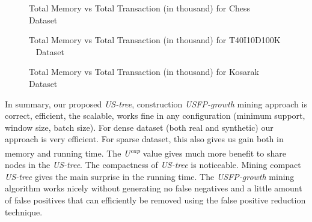 \documentclass[conference]{IEEEtran}
\begin{document}
            \begin{figure}[h]
            \centering
                
            \caption{Total Memory vs Total Transaction (in thousand) for Chess ~\cite{dataset} Dataset }
            \label{result:g_chess_memory_node}
            \end{figure}
            
            \begin{figure}[h]
                
            \caption{Total Memory vs Total Transaction (in thousand) for T40I10D100K ~\cite{dataset} Dataset }
            \label{result:g_t10_memory_node}
            \end{figure}
        
            \begin{figure}[h]
            \centering
                
            \caption{Total Memory vs Total Transaction (in thousand) for Kosarak ~\cite{dataset} Dataset }
            \label{result:g_k_memory_node}
            \end{figure}

In summary, our proposed \emph{US-tree}, construction \emph{USFP-growth} mining approach is correct, efficient, the scalable, works fine in any configuration (minimum support, window size, batch size). For dense dataset (both real and synthetic) our approach is very efficient. For sparse dataset, this also gives us gain both in memory and running time. The \emph{U\textsuperscript{cap}} value gives much more benefit to share nodes in the \emph{US-tree}. The compactness of \emph{US-tree} is noticeable. Mining compact \emph{US-tree} gives the main surprise in the running time. The \emph{USFP-growth} mining algorithm works nicely without generating no false negatives and a little amount of false positives that can efficiently be removed using the false positive reduction technique.
\end{document}
